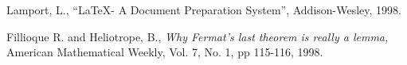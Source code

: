 \documentclass{article}
\begin{document}
\begin{thebibliography}{9}
         {\sc Lamport, L.,}
         ``\LaTeX - A Document Preparation System'',
         Addison-Wesley, 1998.

         {\sc Fillioque R.} and {\sc Heliotrope, B.,}
         {\em Why Fermat's last theorem is really a lemma,}
         American Mathematical Weekly,
         Vol. 7, No. 1, pp 115-116, 1998.

\end{thebibliography}
\end{document}

